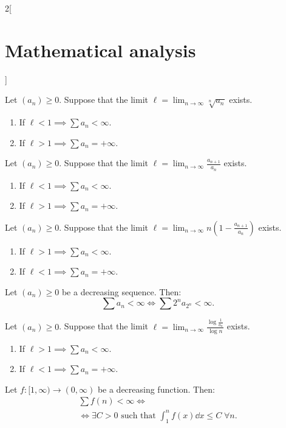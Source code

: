 \documentclass[../../../main.tex]{subfiles}
\begin{document}
\begin{multicols}{2}[\section{Mathematical analysis}]
\begin{theorem}
\end{theorem}
\begin{theorem}
Let $(a_n)\geq 0$. Suppose that the limit $\displaystyle \ell=\lim_{n\to\infty}\sqrt[n]{a_n}$ exists.
\begin{enumerate}
    \item If $\ell<1\implies\sum a_n<\infty$.
    \item If $\ell>1\implies\sum a_n=+\infty$.
\end{enumerate}
\end{theorem}
\begin{theorem}
Let $(a_n)\geq 0$. Suppose that the limit $\displaystyle \ell=\lim_{n\to\infty}\frac{a_{n+1}}{a_n}$ exists.
\begin{enumerate}
    \item If $\ell<1\implies\sum a_n<\infty$.
    \item If $\ell>1\implies\sum a_n=+\infty$.
\end{enumerate}
\end{theorem}
\begin{theorem}
Let $(a_n)\geq 0$. Suppose that the limit $\displaystyle \ell=\lim_{n\to\infty}n\left(1-\frac{a_{n+1}}{a_n}\right)$ exists.
\begin{enumerate}
    \item If $\ell>1\implies\sum a_n<\infty$.
    \item If $\ell<1\implies\sum a_n=+\infty$.
\end{enumerate}
\end{theorem}
\begin{theorem}
Let $(a_n)\geq 0$ be a decreasing sequence. Then: $$\textstyle\sum a_n<\infty\iff\sum 2^na_{2^n}<\infty.$$
\end{theorem}
\begin{theorem}
Let $(a_n)\geq 0$. Suppose that the limit $\displaystyle \ell=\lim_{n\to\infty}\frac{\log\frac{1}{a_n}}{\log n}$ exists.
\begin{enumerate}
    \item If $\ell>1\implies\sum a_n<\infty$.
    \item If $\ell<1\implies\sum a_n=+\infty$.
\end{enumerate}
\end{theorem}
\begin{theorem}\label{MA-inttest}
Let $f:[1,\infty)\rightarrow(0,\infty)$ be a decreasing function. Then:
\begin{multline*}
    \textstyle\sum f(n)<\infty\iff\\ \displaystyle\iff\exists C>0\text{ such that }\int_1^nf(x)\dd x\leq C\;\forall n.
\end{multline*}
\end{theorem}

\end{multicols}
\end{document}
